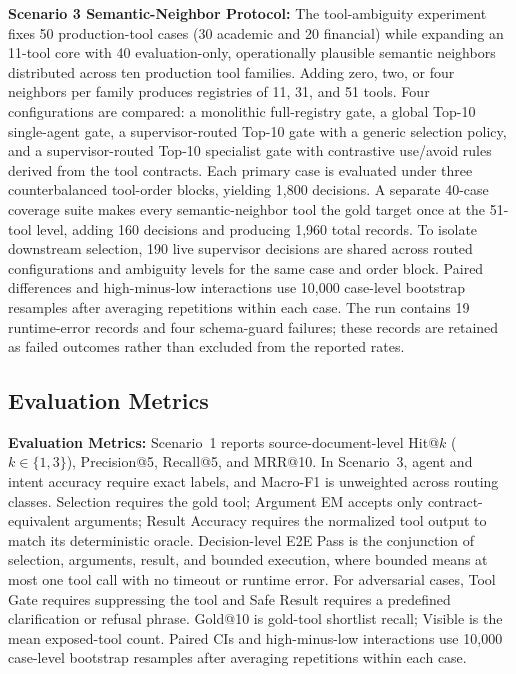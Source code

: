 \noindent\textbf{Scenario 3 Semantic-Neighbor Protocol:} The tool-ambiguity experiment fixes 50 production-tool cases (30 academic and 20 financial) while expanding an 11-tool core with 40 evaluation-only, operationally plausible semantic neighbors distributed across ten production tool families. Adding zero, two, or four neighbors per family produces registries of 11, 31, and 51 tools. Four configurations are compared: a monolithic full-registry gate, a global Top-10 single-agent gate, a supervisor-routed Top-10 gate with a generic selection policy, and a supervisor-routed Top-10 specialist gate with contrastive use/avoid rules derived from the tool contracts. Each primary case is evaluated under three counterbalanced tool-order blocks, yielding 1,800 decisions. A separate 40-case coverage suite makes every semantic-neighbor tool the gold target once at the 51-tool level, adding 160 decisions and producing 1,960 total records. To isolate downstream selection, 190 live supervisor decisions are shared across routed configurations and ambiguity levels for the same case and order block. Paired differences and high-minus-low interactions use 10,000 case-level bootstrap resamples after averaging repetitions within each case. The run contains 19 runtime-error records and four schema-guard failures; these records are retained as failed outcomes rather than excluded from the reported rates.

\subsection{Evaluation Metrics}
\label{sec:metrics}

\noindent\textbf{Evaluation Metrics:} Scenario~1 reports source-document-level Hit@$k$ ($k\in\{1,3\}$), Precision@5, Recall@5, and MRR@10. In Scenario~3, agent and intent accuracy require exact labels, and Macro-F1 is unweighted across routing classes. Selection requires the gold tool; Argument EM accepts only contract-equivalent arguments; Result Accuracy requires the normalized tool output to match its deterministic oracle. Decision-level E2E Pass is the conjunction of selection, arguments, result, and bounded execution, where bounded means at most one tool call with no timeout or runtime error. For adversarial cases, Tool Gate requires suppressing the tool and Safe Result requires a predefined clarification or refusal phrase. Gold@10 is gold-tool shortlist recall; Visible is the mean exposed-tool count. Paired CIs and high-minus-low interactions use 10,000 case-level bootstrap resamples after averaging repetitions within each case.

